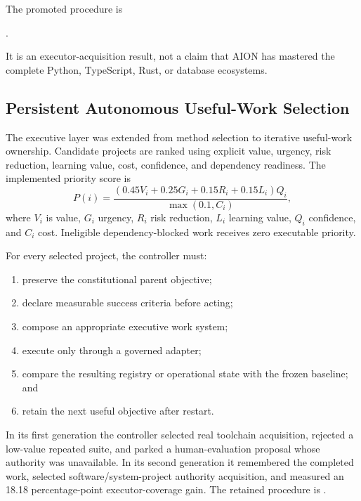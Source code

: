 The promoted procedure is
\begin{center}
\small{}.
\end{center}
It is an executor-acquisition result, not a claim that AION has mastered the complete
Python, TypeScript, Rust, or database ecosystems.

\subsection{Persistent Autonomous Useful-Work Selection}
\label{subsec:aion-useful-work-controller}

The executive layer was extended from method selection to iterative useful-work
ownership.  Candidate projects are ranked using explicit value, urgency, risk
reduction, learning value, cost, confidence, and dependency readiness.  The
implemented priority score is
\begin{equation}
P(i)=
\frac{
  \left(0.45V_i+0.25G_i+0.15R_i+0.15L_i\right)Q_i
}{\max(0.1,C_i)},
\label{eq:aion-useful-work-priority}
\end{equation}
where $V_i$ is value, $G_i$ urgency, $R_i$ risk reduction, $L_i$ learning
value, $Q_i$ confidence, and $C_i$ cost.  Ineligible dependency-blocked work
receives zero executable priority.

For every selected project, the controller must:
\begin{enumerate}
    \item preserve the constitutional parent objective;
    \item declare measurable success criteria before acting;
    \item compose an appropriate executive work system;
    \item execute only through a governed adapter;
    \item compare the resulting registry or operational state with the frozen
          baseline; and
    \item retain the next useful objective after restart.
\end{enumerate}

In its first generation the controller selected real toolchain acquisition,
rejected a low-value repeated suite, and parked a human-evaluation proposal
whose authority was unavailable.  In its second generation it remembered the
completed work, selected software/system-project authority acquisition, and
measured an 18.18 percentage-point executor-coverage gain.  The retained
procedure is .

